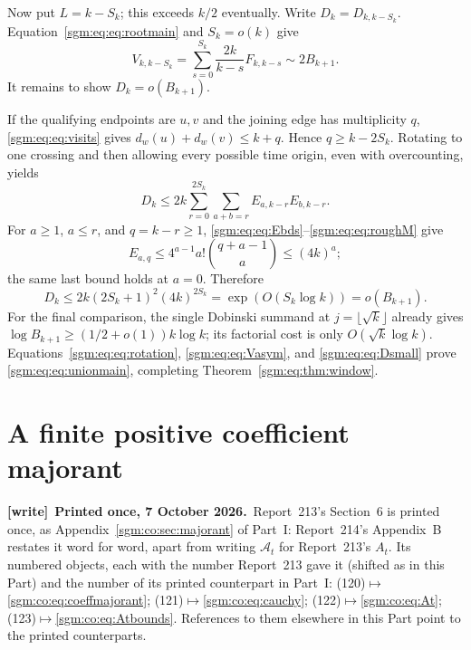 \documentclass[11pt,letterpaper]{article}
\theoremstyle{remark}\newtheorem{remark}[theorem]{Remark}
\newenvironment{writenote}[1][]{\par\smallskip\begingroup\small
 \noindent\textbf{[write]}\if\relax\detokenize{#1}\relax\else~\textbf{#1.}\fi\ }%
 {\par\endgroup\smallskip}
\theoremstyle{definition}\newtheorem{definition}[theorem]{Definition}
\begin{document}
Now put $L=k-S_k$; this exceeds $k/2$ eventually. Write $D_k=D_{k,k-S_k}$. Equation~\eqref{sgm:eq:eq:rootmain} and $S_k=o(k)$ give
\begin{equation}\label{sgm:eq:eq:Vasym}
 V_{k,k-S_k}=\sum_{s=0}^{S_k}\frac{2k}{k-s}F_{k,k-s}\sim2B_{k+1}.
\end{equation}
It remains to show $D_k=o(B_{k+1})$.

If the qualifying endpoints are $u,v$ and the joining edge has multiplicity $q$, \eqref{sgm:eq:eq:visits} gives $d_w(u)+d_w(v)\le k+q$. Hence $q\ge k-2S_k$. Rotating to one crossing and then allowing every possible time origin, even with overcounting, yields
\[
 D_k\le2k\sum_{r=0}^{2S_k}\sum_{a+b=r}E_{a,k-r}E_{b,k-r}.
\]
For $a\ge1$, $a\le r$, and $q=k-r\ge1$, \eqref{sgm:eq:eq:Ebds}--\eqref{sgm:eq:eq:roughM} give
\[
 E_{a,q}\le4^{a-1}a!\binom{q+a-1}{a}\le(4k)^a;
\]
the same last bound holds at $a=0$. Therefore
\begin{equation}\label{sgm:eq:eq:Dsmall}
 D_k\le2k(2S_k+1)^2(4k)^{2S_k}
       =\exp(O(S_k\log k))=o(B_{k+1}).
\end{equation}
For the final comparison, the single Dobinski summand at $j=\lfloor\sqrt k\rfloor$ already gives
$\log B_{k+1}\ge(1/2+o(1))k\log k$; its factorial cost is only $O(\sqrt k\log k)$. Equations~\eqref{sgm:eq:eq:rotation}, \eqref{sgm:eq:eq:Vasym}, and \eqref{sgm:eq:eq:Dsmall} prove \eqref{sgm:eq:eq:unionmain}, completing Theorem~\ref{sgm:eq:thm:window}.

\section{A finite positive coefficient majorant}\label{sgm:eq:sec:majorant}
\begin{writenote}[Printed once, 7 October 2026]Report~213's Section~6 is printed once, as Appendix~\ref{sgm:co:sec:majorant} of Part~I: Report~214's Appendix~B restates it word for word, apart from writing $\mathcal A_t$ for Report~213's $A_t$. Its numbered objects, each with the number Report~213 gave it (shifted as in this Part) and the number of its printed counterpart in Part~I: (120)${}\mapsto{}$\eqref{sgm:co:eq:coeffmajorant}; (121)${}\mapsto{}$\eqref{sgm:co:eq:cauchy}; (122)${}\mapsto{}$\eqref{sgm:co:eq:At}; (123)${}\mapsto{}$\eqref{sgm:co:eq:Atbounds}. References to them elsewhere in this Part point to the printed counterparts.
\end{writenote}
\addtocounter{equation}{4}%
\end{document}
